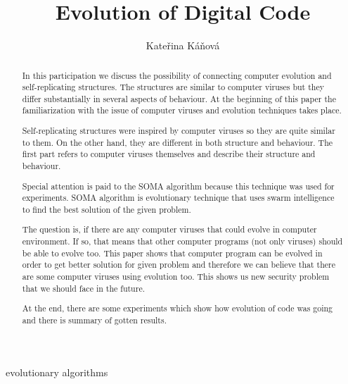 \documentclass[review]{elsarticle}
\begin{document}
\begin{frontmatter}

\title{Evolution of Digital Code}

\author{Kateřina Káňová}%
\address{}




\begin{abstract}
In this participation we discuss the possibility of connecting computer evolution and self-replicating structures. The structures are similar to computer viruses but they differ substantially in several aspects of behaviour. At the beginning of this paper the familiarization with the issue of computer viruses and evolution techniques takes place. 

Self-replicating structures were inspired by computer viruses so they are quite similar to them. On the other hand, they are different in both structure and behaviour. The first part refers to computer viruses themselves and describe their structure and behaviour.

Special attention is paid to the SOMA algorithm because this technique was used for experiments. SOMA algorithm is evolutionary technique that uses swarm intelligence to find the best solution of the given problem.

The question is, if there are any computer viruses that could evolve in computer environment. If so, that means that other computer programs (not only viruses) should be able to evolve too. This paper shows that computer program can be evolved in order to get better solution for given problem and therefore we can believe that there are some computer viruses using evolution too. This shows us new security problem that we should face in the future. 

At the end, there are some experiments which show how evolution of code was going and there is summary of gotten results.

\end{abstract}

\begin{keyword}
evolutionary algorithms
\end{keyword}

\end{frontmatter}
\end{document}
